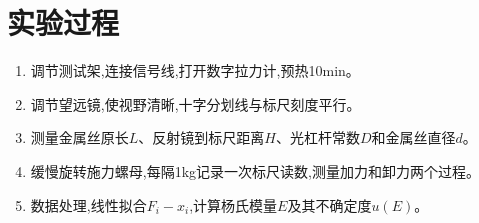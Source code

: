 \documentclass[UTF8]{ctexart}
\begin{document}
\section{实验过程}
\begin{enumerate}
    \item 调节测试架,连接信号线,打开数字拉力计,预热10min。
    \item 调节望远镜,使视野清晰,十字分划线与标尺刻度平行。
    \item 测量金属丝原长$L$、反射镜到标尺距离$H$、光杠杆常数$D$和金属丝直径$d$。
    \item 缓慢旋转施力螺母,每隔1kg记录一次标尺读数,测量加力和卸力两个过程。
    \item 数据处理,线性拟合$F_i-x_i$,计算杨氏模量$E$及其不确定度$u(E)$。
\end{enumerate}
\end{document}
